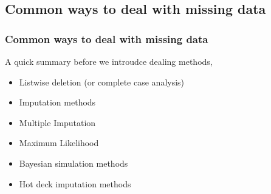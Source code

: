\documentclass{beamer}
\begin{document}
\subsection{Common ways to deal with missing data}
\fontsize{11pt}{7.2}\selectfont
\begin{frame}
\frametitle{Common ways to deal with missing data}
A quick summary before we introudce dealing methods, \cite{p3}\\
	\begin{itemize}
		\item Listwise deletion (or complete case analysis)
		\item Imputation methods
		\item Multiple Imputation
		\item Maximum Likelihood 
		\item Bayesian simulation methods
		\item Hot deck imputation methods
	\end{itemize}
\end{frame}
\end{document}
